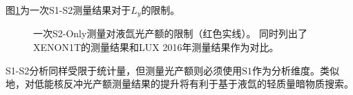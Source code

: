图\ref{fig:ly_sensitivity_s1s2}为一次S1-S2测量结果对于$L_y$的限制。

\begin{figure}
  \centering
  
  \caption{\label{fig:ly_sensitivity_s1s2} 一次S2-Only测量对液氙光产额的限制（红色实线）。
  同时列出了XENON1T的测量结果\cite{aprile_search_2021}和LUX 2016年测量结果\cite{lux_collaboration_low-energy_2016}作为对比。}
\end{figure}

S1-S2分析同样受限于统计量，但测量光产额则必须使用$\mathrm{S1}$作为分析维度。类似地，对低能核反冲光产额测量结果的提升将有利于基于液氙的轻质量暗物质搜索。
